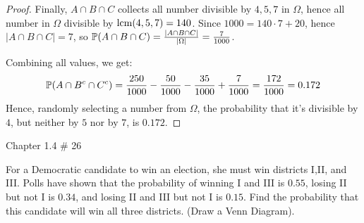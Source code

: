 \documentclass{article}
\begin{document}
\begin{proof}
    Finally, $A\cap B\cap C$ collects all number divisible by $4,5,7$ in $\Omega$, hence all number in $\Omega$ divisible by $\mathrm{lcm}(4,5,7)=140$. Since $1000=140\cdot 7+20$, hence $|A\cap B\cap C|=7$, so $\mathbb{P}(A\cap B\cap C)=\frac{|A\cap B\cap C|}{|\Omega|}=\frac{7}{1000}$.

    Combining all values, we get:
    \begin{align}
        \mathbb{P}(A\cap B^c\cap C^c) = \frac{250}{1000}-\frac{50}{1000}-\frac{35}{1000}+\frac{7}{1000} = \frac{172}{1000} = 0.172
    \end{align}
    Hence, randomly selecting a number from $\Omega$, the probability that it's divisible by $4$, but neither by $5$ nor by $7$, is $0.172$.

\end{proof}

\newpage

\begin{ques}\label{q8}
    Chapter 1.4 \# 26

    For a Democratic candidate to win an election, she must win districts I,II, and III. Polls have shown that the probability of winning I and III is $0.55$, losing II but not I is $0.34$, and losing II and III but not I is $0.15$. Find the probability that this candidate will win all three districts. (Draw a Venn Diagram).
\end{ques}
\end{document}
